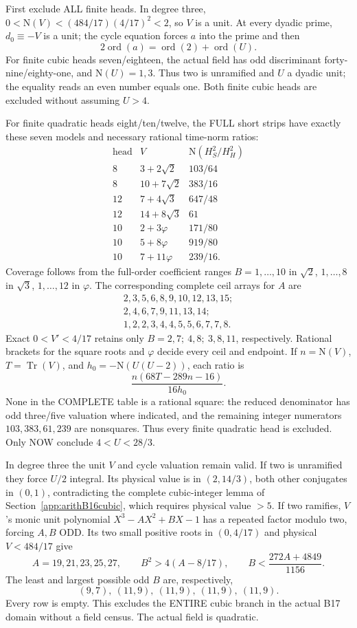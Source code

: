 \documentclass[11pt]{article}
\begin{document}
First exclude ALL finite heads.
In degree three,
\(0<\mathrm N(V)<(484/17)(4/17)^2<2\),
so \(V\) is a unit.
At every dyadic prime, \(d_0\equiv-V\) is a unit;
the cycle equation forces \(a\) into the prime
and then
\[
                     2\operatorname{ord}(a)
                      =\operatorname{ord}(2)+\operatorname{ord}(U).
\]
For finite cubic heads seven/eighteen,
the actual field has odd discriminant
forty-nine/eighty-one, and \(\mathrm N(U)=1,3\).
Thus two is unramified and \(U\) a dyadic unit;
the equality reads an even number equals one.
Both finite cubic heads are excluded without
assuming \(U>4\).

For finite quadratic heads eight/ten/twelve,
the FULL short strips have exactly these seven
models and necessary rational time-norm ratios:
\[
\begin{array}{c|c|c}
 \text{head}&V&
 \mathrm N(H_S^2/H_H^2)\\ \hline
8&3+2\sqrt2&103/64\\
8&10+7\sqrt2&383/16\\
12&7+4\sqrt3&647/48\\
12&14+8\sqrt3&61\\
10&2+3\varphi&171/80\\
10&5+8\varphi&919/80\\
10&7+11\varphi&239/16 .
\end{array}
\]
Coverage follows from the full-order coefficient
ranges \(B=1,\ldots,10\) in \(\sqrt2\),
\(1,\ldots,8\) in \(\sqrt3\),
\(1,\ldots,12\) in \(\varphi\).
The corresponding complete ceil arrays for \(A\) are
\[
 \begin{gathered}
 2,3,5,6,8,9,10,12,13,15;\\
 2,4,6,7,9,11,13,14;\\
 1,2,2,3,4,4,5,5,6,7,7,8 .
 \end{gathered}
\]
Exact \(0<V'<4/17\) retains only
\(B=2,7;\ 4,8;\ 3,8,11\), respectively.
Rational brackets for the square roots and
\(\varphi\) decide every ceil and endpoint.
If \(n=\mathrm N(V)\), \(T=\operatorname{Tr}(V)\),
and \(h_0=-\mathrm N(U(U-2))\), each ratio is
\[
                     {\frac{n(68T-289n-16)}{16h_0}}.
\]
None in the COMPLETE table is a rational square:
the reduced denominator has odd three/five
valuation where indicated, and the remaining
integer numerators \(103,383,61,239\) are
nonsquares.
Thus every finite quadratic head is excluded.
Only NOW conclude \(4<U<28/3\).

In degree three the unit \(V\) and cycle valuation
remain valid.
If two is unramified they force \(U/2\) integral.
Its physical value is in \((2,14/3)\), both other
conjugates in \((0,1)\), contradicting the
complete cubic-integer lemma of
Section~\ref{app:arithB16cubic}, which requires
physical value \(>5\).
If two ramifies, \(V\)'s monic unit polynomial
\(X^3-AX^2+BX-1\) has a repeated factor modulo
two, forcing \(A,B\) ODD.
Its two small positive roots in \((0,4/17)\)
and physical \(V<484/17\) give
\[
 A=19,21,23,25,27,\qquad
 B^2>4(A-8/17),\qquad
 B<{\frac{272A+4849}{1156}}.
\]
The least and largest possible odd \(B\) are,
respectively,
\[
                (9,7),\ (11,9),\ (11,9),\ (11,9),\ (11,9).
\]
Every row is empty.
This excludes the ENTIRE cubic branch in the
actual B17 domain without a field census.
The actual field is quadratic.
\end{document}
